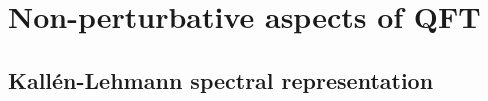 \documentclass[../QFT_main.tex]{subfiles}
\begin{document}
\chapter{Non-perturbative aspects of QFT}



\section{Kallén-Lehmann spectral representation}
\end{document}
